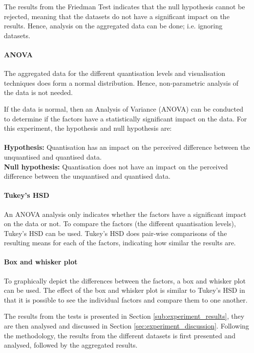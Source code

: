 The results from the Friedman Test indicates that the null hypothesis cannot be
rejected, meaning that the datasets do not have a significant impact on the
results. Hence, analysis on the aggregated data can be done; i.e. ignoring
datasets.

\paragraph{ANOVA}
The aggregated data for the different quantisation levels and visualisation
techniques does form a normal distribution. Hence, non-parametric analysis of
the data is not needed.

If the data is normal, then an Analysis of Variance (ANOVA) can be conducted to
determine if the factors have a statistically significant impact on the data.
For this experiment, the hypothesis and null hypothesis are: \\ \\
\textbf{Hypothesis:} Quantisation has an impact on the perceived difference
between the unquantised and quantised data. \\
\textbf{Null hypothesis:} Quantisation does not have an impact on the perceived
difference between the unquantised and quantised data.

\paragraph{Tukey's HSD} An ANOVA analysis only indicates whether the factors
have a significant impact on the data or not. To compare the factors (the
different quantisation levels), Tukey's HSD can be used.  Tukey's HSD does
pair-wise comparisons of the resulting means for each of the factors,
indicating how similar the results are.

\paragraph{Box and whisker plot} To graphically depict the differences between
the factors, a box and whisker plot can be used. The effect of the box and
whisker plot is similar to Tukey's HSD in that it is possible to see the
individual factors and compare them to one another.

The results from the tests is presented in Section
\ref{sub:experiment_results}, they are then analysed and discussed in Section
\ref{sec:experiment_discussion}. Following the methodology, the results from
the different datasets is first presented and analysed, followed by the
aggregated results.


